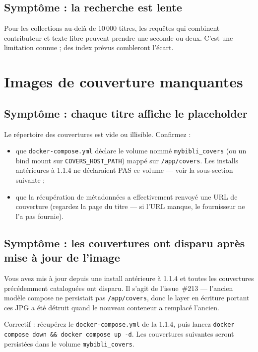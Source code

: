 \subsection*{Symptôme : la recherche est lente}

Pour les collections au-delà de 10\,000 titres, les requêtes qui
combinent contributeur et texte libre peuvent prendre une
seconde ou deux. C'est une limitation connue ; des index prévus
combleront l'écart.

\section{Images de couverture manquantes}

\subsection*{Symptôme : chaque titre affiche le placeholder}\label{sec:troubleshoot-couvertures-manquantes}

Le répertoire des couvertures est vide ou illisible. Confirmez :

\begin{itemize}
  \item que \texttt{docker-compose.yml} déclare le volume nommé
        \texttt{mybibli\_covers} (ou un bind mount sur
        \texttt{COVERS\_HOST\_PATH}) mappé sur \texttt{/app/covers}.
        Les installs antérieures à 1.1.4 ne déclaraient PAS ce
        volume — voir la sous-section suivante ;
  \item que la récupération de métadonnées a effectivement renvoyé
        une URL de couverture (regardez la page du titre — si l'URL
        manque, le fournisseur ne l'a pas fournie).
\end{itemize}

\subsection*{Symptôme : les couvertures ont disparu après mise à jour de l'image}\label{sec:troubleshoot-couvertures-perte-mise-a-jour}

Vous avez mis à jour depuis une install antérieure à 1.1.4 et toutes
les couvertures précédemment cataloguées ont disparu. Il s'agit de
l'issue~\#213 — l'ancien modèle compose ne persistait pas
\texttt{/app/covers}, donc le layer en écriture portant ces JPG a
été détruit quand le nouveau conteneur a remplacé l'ancien.

Correctif : récupérez le \texttt{docker-compose.yml} de la 1.1.4,
puis lancez \texttt{docker compose down \&\& docker compose up -d}.
Les couvertures suivantes seront persistées dans le volume
\texttt{mybibli\_covers}.

